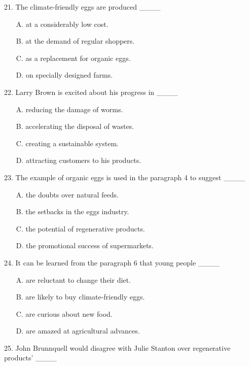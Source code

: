 \documentclass[UTF8,11pt]{ctexart}
\begin{document}
21. The climate-friendly eggs are produced \_\_\_\_


\begin{itemize}[leftmargin=2em,itemsep=.2em,topsep=.4em]\item[A.] at a considerably low cost.
\item[B.] at the demand of regular shoppers.
\item[C.] as a replacement for organic eggs.
\item[D.] on specially designed farms.
\end{itemize}

22. Larry Brown is excited about his progress in \_\_\_\_


\begin{itemize}[leftmargin=2em,itemsep=.2em,topsep=.4em]\item[A.] reducing the damage of worms.
\item[B.] accelerating the disposal of wastes.
\item[C.] creating a sustainable system.
\item[D.] attracting customers to his products.
\end{itemize}

23. The example of organic eggs is used in the paragraph 4 to suggest \_\_\_\_


\begin{itemize}[leftmargin=2em,itemsep=.2em,topsep=.4em]\item[A.] the doubts over natural feeds.
\item[B.] the setbacks in the eggs industry.
\item[C.] the potential of regenerative products.
\item[D.] the promotional success of supermarkets.
\end{itemize}

24. It can be learned from the paragraph 6 that young people \_\_\_\_


\begin{itemize}[leftmargin=2em,itemsep=.2em,topsep=.4em]\item[A.] are reluctant to change their diet.
\item[B.] are likely to buy climate-friendly eggs.
\item[C.] are curious about new food.
\item[D.] are amazed at agricultural advances.
\end{itemize}

25. John Brunnquell would disagree with Julie Stanton over regenerative products’ \_\_\_\_
\end{document}
